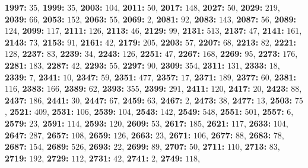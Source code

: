 \textsf{\bfseries 1997:} $35$, \textsf{\bfseries 1999:} $35$, \textsf{\bfseries 2003:} $104$, \textsf{\bfseries 2011:} $50$, \textsf{\bfseries 2017:} $148$, \textsf{\bfseries 2027:} $50$, \textsf{\bfseries 2029:} $219$, \textsf{\bfseries 2039:} $66$, \textsf{\bfseries 2053:} $152$, \textsf{\bfseries 2063:} $55$, \textsf{\bfseries 2069:} $2$, \textsf{\bfseries 2081:} $92$, \textsf{\bfseries 2083:} $143$, \textsf{\bfseries 2087:} $56$, \textsf{\bfseries 2089:} $124$, \textsf{\bfseries 2099:} $117$, \textsf{\bfseries 2111:} $126$, \textsf{\bfseries 2113:} $46$, \textsf{\bfseries 2129:} $99$, \textsf{\bfseries 2131:} $513$, \textsf{\bfseries 2137:} $47$, \textsf{\bfseries 2141:} $161$, \textsf{\bfseries 2143:} $73$, \textsf{\bfseries 2153:} $91$, \textsf{\bfseries 2161:} $42$, \textsf{\bfseries 2179:} $205$, \textsf{\bfseries 2203:} $57$, \textsf{\bfseries 2207:} $68$, \textsf{\bfseries 2213:} $82$, \textsf{\bfseries 2221:} $128$, \textsf{\bfseries 2237:} $83$, \textsf{\bfseries 2239:} $34$, \textsf{\bfseries 2243:} $126$, \textsf{\bfseries 2251:} $47$, \textsf{\bfseries 2267:} $168$, \textsf{\bfseries 2269:} $95$, \textsf{\bfseries 2273:} $176$, \textsf{\bfseries 2281:} $183$, \textsf{\bfseries 2287:} $42$, \textsf{\bfseries 2293:} $55$, \textsf{\bfseries 2297:} $90$, \textsf{\bfseries 2309:} $354$, \textsf{\bfseries 2311:} $131$, \textsf{\bfseries 2333:} $18$, \textsf{\bfseries 2339:} $7$, \textsf{\bfseries 2341:} $10$, \textsf{\bfseries 2347:} $59$, \textsf{\bfseries 2351:} $477$, \textsf{\bfseries 2357:} $17$, \textsf{\bfseries 2371:} $189$, \textsf{\bfseries 2377:} $60$, \textsf{\bfseries 2381:} $116$, \textsf{\bfseries 2383:} $166$, \textsf{\bfseries 2389:} $62$, \textsf{\bfseries 2393:} $355$, \textsf{\bfseries 2399:} $291$, \textsf{\bfseries 2411:} $120$, \textsf{\bfseries 2417:} $20$, \textsf{\bfseries 2423:} $88$, \textsf{\bfseries 2437:} $186$, \textsf{\bfseries 2441:} $30$, \textsf{\bfseries 2447:} $67$, \textsf{\bfseries 2459:} $63$, \textsf{\bfseries 2467:} $2$, \textsf{\bfseries 2473:} $38$, \textsf{\bfseries 2477:} $13$, \textsf{\bfseries 2503:} $75$, \textsf{\bfseries 2521:} $409$, \textsf{\bfseries 2531:} $106$, \textsf{\bfseries 2539:} $104$, \textsf{\bfseries 2543:} $142$, \textsf{\bfseries 2549:} $548$, \textsf{\bfseries 2551:} $501$, \textsf{\bfseries 2557:} $6$, \textsf{\bfseries 2579:} $23$, \textsf{\bfseries 2591:} $114$, \textsf{\bfseries 2593:} $120$, \textsf{\bfseries 2609:} $53$, \textsf{\bfseries 2617:} $185$, \textsf{\bfseries 2621:} $117$, \textsf{\bfseries 2633:} $104$, \textsf{\bfseries 2647:} $287$, \textsf{\bfseries 2657:} $108$, \textsf{\bfseries 2659:} $126$, \textsf{\bfseries 2663:} $23$, \textsf{\bfseries 2671:} $106$, \textsf{\bfseries 2677:} $88$, \textsf{\bfseries 2683:} $78$, \textsf{\bfseries 2687:} $154$, \textsf{\bfseries 2689:} $526$, \textsf{\bfseries 2693:} $22$, \textsf{\bfseries 2699:} $89$, \textsf{\bfseries 2707:} $50$, \textsf{\bfseries 2711:} $110$, \textsf{\bfseries 2713:} $83$, \textsf{\bfseries 2719:} $192$, \textsf{\bfseries 2729:} $112$, \textsf{\bfseries 2731:} $42$, \textsf{\bfseries 2741:} $2$, \textsf{\bfseries 2749:} $118$, 
